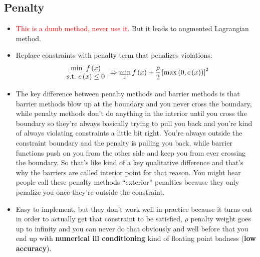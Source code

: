 \subsection{Penalty}

\begin{itemize}
    \item \textcolor{red}{This is a dumb method, never use it.} But it leads to augmented Lagrangian method.
    \item Replace constraints with penalty term that penalizes violations:
    \begin{equation}
        \begin{array}{c}
            \min\text{\,\,}f\left( x \right)\\
            \text{s.t.\,\,}c\left( x \right) \le 0\\
        \end{array}\Rightarrow \min_xf\left( x \right) +\frac{\rho}{2}\left[ \max \left( 0,c\left( x \right) \right) \right] ^2
    \end{equation}
    \item The key difference between penalty methods and barrier methods is that barrier methods blow up at the boundary and you never cross the boundary, while penalty methods don't do anything in the interior until you cross the boundary so they're always basically trying to pull you back and you're kind of always violating constraints a little bit right. You're always outside the constraint boundary and the penalty is pulling you back, while barrier functions push on you from the other side and keep you from ever crossing the boundary. So that's like kind of a key qualitative difference and that's why the barriers are called interior point for that reason. You might hear people call these penalty methods ``exterior'' penalties because they only penalize you once they're outside the constraint.
    \item Easy to implement, but they don't work well in practice because it turns out in order to actually get that constraint to be satisfied, $\rho$ penalty weight goes up to infinity and you can never do that obviously and well before that you end up with \textbf{numerical ill conditioning} kind of floating point badness (\textbf{low accuracy}).
\end{itemize}

